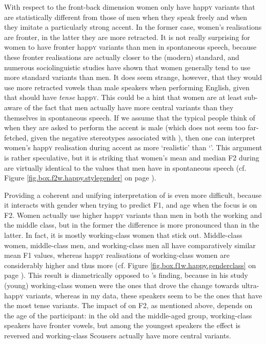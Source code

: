With respect to the front-back dimension women only have happ\textsc{y} variants that are statistically different from those of men when they speak freely and when they imitate a particularly strong  accent.
In the former case, women's realisations are fronter, in the latter they are more retracted.
It is not really surprising for women to have fronter happ\textsc{y} variants than men in spontaneous speech, because these fronter realisations are actually closer to the (modern) standard, and numerous sociolinguistic studies have shown that women generally tend to use more standard variants than men.
It does seem strange, however, that they would use more retracted vowels than male speakers when performing  English, given that   should have \emph{tense} happ\textsc{y}.
This could be a hint that women are at least sub- aware of the fact that men actually have more central variants than they themselves in spontaneous speech.
If we assume that the typical  people think of when they are asked to perform the accent is male (which does not seem too far-fetched, given the negative stereotypes associated with ), then one can interpret women's happ\textsc{y} realisation during accent  as more `realistic' than `'.
This argument is rather speculative, but it is striking that women's mean and median F2 during  are virtually identical to the values that men have in spontaneous speech (cf. Figure \ref{fig.box.f2w.happy.stylegender} on page \pageref{fig.box.f2w.happy.stylegender}).

Providing a coherent and unifying interpretation of  is even more difficult, because it interacts with gender when trying to predict F1, and age when the focus is on F2.
Women actually use higher happ\textsc{y} variants than men in both the working and the middle class, but in the former the difference is more pronounced than in the latter.
In fact, it is mostly working-class women that stick out.
Middle-class women, middle-class men, and working-class men all have comparatively similar mean F1 values, whereas happ\textsc{y} realisations of working-class women are considerably higher and thus more  (cf. Figure \ref{fig.box.f1w.happy.genderclass} on page \pageref{fig.box.f1w.happy.genderclass}).
This result is diametrically opposed to \textcite{flynn2010}'s finding, because in his study (young) working-class women were the ones that drove the change towards ultra- happ\textsc{y} variants, whereas in my data, these speakers seem to be the ones that have the most tense variants.
The impact of  on F2, as mentioned above, depends on the age of the participant: in the old and the middle-aged group, working-class speakers have fronter vowels, but among the youngest speakers the effect is reversed and working-class Scousers actually have more central variants.

